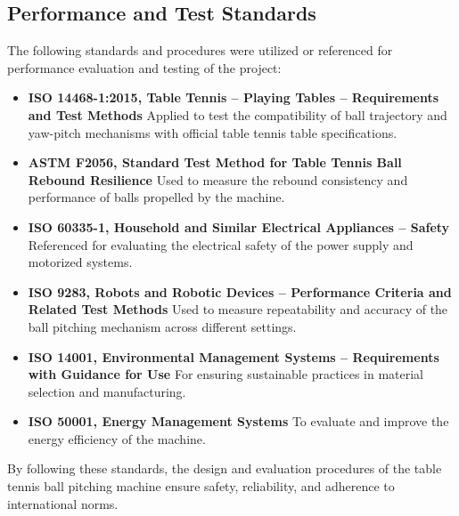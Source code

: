 \documentclass[12pt]{report}
\begin{document}
\subsection{Performance and Test Standards}
The following standards and procedures were utilized or referenced for performance evaluation and testing of the project:
\begin{itemize}
    \item \textbf{ISO 14468-1:2015, Table Tennis – Playing Tables – Requirements and Test Methods}\cite{ISO14468-1:2015}
    Applied to test the compatibility of ball trajectory and yaw-pitch mechanisms with official table tennis table specifications.
    
    \item \textbf{ASTM F2056, Standard Test Method for Table Tennis Ball Rebound Resilience}\cite{ASTMF2056}
    Used to measure the rebound consistency and performance of balls propelled by the machine.
    
    \item \textbf{ISO 60335-1, Household and Similar Electrical Appliances – Safety}\cite{ISO60335-1:2020}
    Referenced for evaluating the electrical safety of the power supply and motorized systems.
    
    \item \textbf{ISO 9283, Robots and Robotic Devices – Performance Criteria and Related Test Methods}\cite{ISO9283:1998}
    Used to measure repeatability and accuracy of the ball pitching mechanism across different settings.
    
    \item \textbf{ISO 14001, Environmental Management Systems – Requirements with Guidance for Use}\cite{ISO14001:2015}
    For ensuring sustainable practices in material selection and manufacturing.
    
    \item \textbf{ISO 50001, Energy Management Systems}\cite{ISO50001:2018}
    To evaluate and improve the energy efficiency of the machine.
\end{itemize}
By following these standards, the design and evaluation procedures of the table tennis ball pitching machine ensure safety, reliability, and adherence to international norms.
\end{document}
